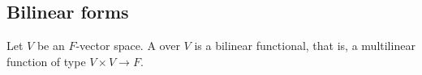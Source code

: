 \subsection{Bilinear forms}\label{subsec:bilinear_forms}

\begin{definition}\label{def:bilinear_form}\cite[249]{Knapp2016BAlg}
  Let \( V \) be an \( F \)-vector space. A  over \( V \) is a bilinear functional, that is, a multilinear function of type \( V \times V \to F \).
\end{definition}
